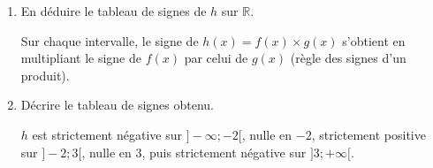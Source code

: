 \documentclass[10pt,a4paper]{article}
\begin{document}
\begin{enumerate}
\item En déduire le tableau de signes de \(h\) sur \(\mathbb{R}\).

Sur chaque intervalle, le signe de \(h(x)=f(x)\times g(x)\) s'obtient en multipliant le signe de \(f(x)\) par celui de \(g(x)\) (règle des signes d'un produit).

\begin{center}
\end{center}

\item Décrire le tableau de signes obtenu.

\(h\) est strictement négative sur \(]-\infty;-2[\), nulle en \(-2\), strictement positive sur \(]-2;3[\), nulle en \(3\), puis strictement négative sur \(]3;+\infty[\).
\end{enumerate}
\end{document}
